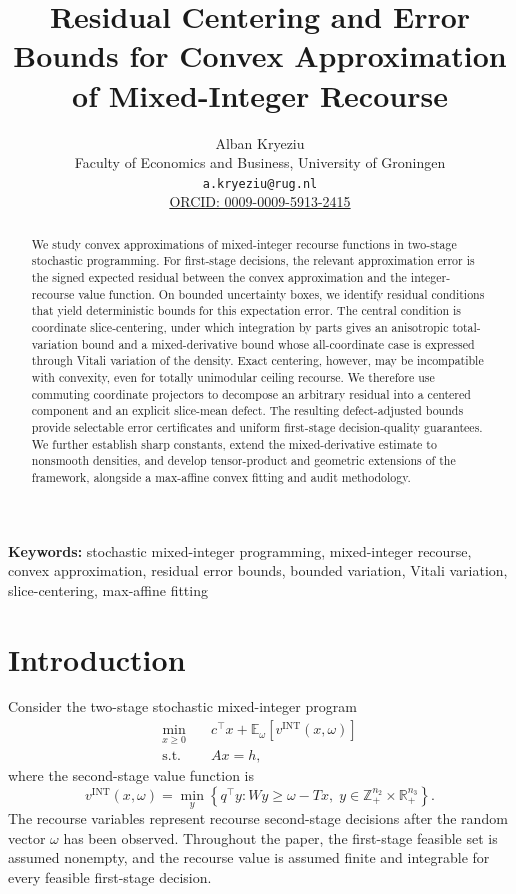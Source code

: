 \documentclass[11pt,letterpaper]{article}
\title{Residual Centering and Error Bounds for Convex Approximation of Mixed-Integer Recourse}
\author{
Alban Kryeziu\\
\small Faculty of Economics and Business, University of Groningen\\
\small \texttt{a.kryeziu@rug.nl}\\
\small \href{https://orcid.org/0009-0009-5913-2415}
{ORCID: 0009-0009-5913-2415}
}
\date{}
\theoremstyle{definition}
\theoremstyle{remark}
\newcommand{\INT}{\mathrm{INT}}
\begin{document}
\maketitle


\begin{abstract}
We study convex approximations of mixed-integer recourse functions in
two-stage stochastic programming. For first-stage decisions, the relevant approximation error is the signed expected residual between the convex
approximation and the integer-recourse value function. On bounded uncertainty boxes, we identify residual conditions that yield deterministic bounds for this expectation error. The central condition is coordinate slice-centering, under which integration by parts gives an anisotropic total-variation bound and a mixed-derivative bound whose all-coordinate case is expressed through Vitali variation of the density. Exact centering, however, may be incompatible with convexity, even for totally unimodular ceiling recourse. We therefore use commuting coordinate projectors to decompose an arbitrary residual into a centered component and an explicit slice-mean defect. The resulting defect-adjusted bounds provide selectable error certificates and uniform first-stage decision-quality guarantees. We further establish sharp constants, extend the mixed-derivative estimate to nonsmooth densities, and develop tensor-product and geometric extensions of the framework, alongside a max-affine convex fitting and audit methodology.
\end{abstract}




\noindent\textbf{Keywords:} stochastic mixed-integer programming, mixed-integer recourse, convex approximation, residual error bounds, bounded variation, Vitali variation, slice-centering, max-affine fitting

\clearpage
\tableofcontents
\clearpage



\section{Introduction}
\label{sec:introduction}

Consider the two-stage stochastic mixed-integer program
\begin{align}
\min_{x\geq 0}\quad & c^\top x+\mathbb E_\omega[v^{\INT}(x,\omega)]
\label{eq:intro_smip}
\\
\text{s.t.}\quad & Ax=h,
\nonumber
\end{align}
where the second-stage value function is
\begin{equation}
\label{eq:intro_second_stage}
v^{\INT}(x,\omega)
=
\min_y
\left\{
q^\top y:
Wy\geq \omega-Tx,\;
y\in\mathbb Z^{n_2}_+\times\mathbb R^{n_3}_+
\right\}.
\end{equation}
The recourse variables represent recourse second-stage decisions after the
random vector $\omega$ has been observed. Throughout the paper, the first-stage
feasible set is assumed nonempty, and the recourse value is assumed finite and
integrable for every feasible first-stage decision.
\end{document}
